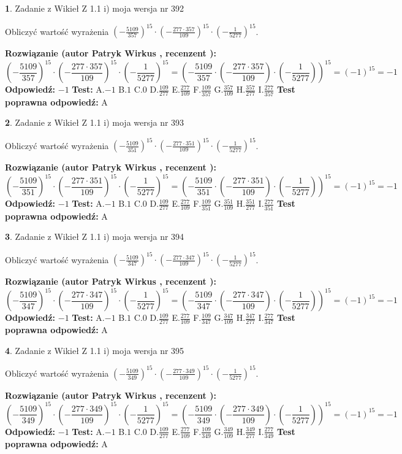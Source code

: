 \documentclass[12pt, a4paper]{article}
\theoremstyle{definition} %
\newtheorem{zad}{}
\newcommand{\zadStart}[1]{\begin{zad}#1\newline}
\newcommand{\zadStop}{\end{zad}}
\newcommand{\rozwStart}[2]{\noindent \textbf{Rozwiązanie (autor #1 , recenzent #2): }\newline}
\newcommand{\rozwStop}{\newline}
\newcommand{\odpStart}{\noindent \textbf{Odpowiedź:}\newline}
\newcommand{\odpStop}{\newline}
\newcommand{\testStart}{\noindent \textbf{Test:}\newline}
\newcommand{\testStop}{\newline}
\newcommand{\kluczStart}{\noindent \textbf{Test poprawna odpowiedź:}\newline}
\newcommand{\kluczStop}{\newline}
\begin{document}
\zadStart{Zadanie z Wikieł Z 1.1 i) moja wersja nr 392}

Obliczyć wartość wyrażenia $(-\frac{5109}{357})^{15} \cdot (-\frac{277 \cdot 357}{109})^{15} \cdot (-\frac{1}{5277})^{15}$.
\zadStop
\rozwStart{Patryk Wirkus}{}
$$(-\frac{5109}{357})^{15} \cdot (-\frac{277 \cdot 357}{109})^{15} \cdot (-\frac{1}{5277})^{15} = (-\frac{5109}{357} \cdot (-\frac{277 \cdot 357}{109}) \cdot (-\frac{1}{5277}))^{15} = (-1)^{15} = -1$$
\rozwStop
\odpStart
$-1$
\odpStop
\testStart
A.$-1$ B.$1$ C.$0$ D.$\frac{109}{277}$ E.$\frac{277}{109}$
F.$\frac{109}{357}$ G.$\frac{357}{109}$
H.$\frac{357}{277}$
I.$\frac{277}{357}$
\testStop
\kluczStart
A
\kluczStop



\zadStart{Zadanie z Wikieł Z 1.1 i) moja wersja nr 393}

Obliczyć wartość wyrażenia $(-\frac{5109}{351})^{15} \cdot (-\frac{277 \cdot 351}{109})^{15} \cdot (-\frac{1}{5277})^{15}$.
\zadStop
\rozwStart{Patryk Wirkus}{}
$$(-\frac{5109}{351})^{15} \cdot (-\frac{277 \cdot 351}{109})^{15} \cdot (-\frac{1}{5277})^{15} = (-\frac{5109}{351} \cdot (-\frac{277 \cdot 351}{109}) \cdot (-\frac{1}{5277}))^{15} = (-1)^{15} = -1$$
\rozwStop
\odpStart
$-1$
\odpStop
\testStart
A.$-1$ B.$1$ C.$0$ D.$\frac{109}{277}$ E.$\frac{277}{109}$
F.$\frac{109}{351}$ G.$\frac{351}{109}$
H.$\frac{351}{277}$
I.$\frac{277}{351}$
\testStop
\kluczStart
A
\kluczStop



\zadStart{Zadanie z Wikieł Z 1.1 i) moja wersja nr 394}

Obliczyć wartość wyrażenia $(-\frac{5109}{347})^{15} \cdot (-\frac{277 \cdot 347}{109})^{15} \cdot (-\frac{1}{5277})^{15}$.
\zadStop
\rozwStart{Patryk Wirkus}{}
$$(-\frac{5109}{347})^{15} \cdot (-\frac{277 \cdot 347}{109})^{15} \cdot (-\frac{1}{5277})^{15} = (-\frac{5109}{347} \cdot (-\frac{277 \cdot 347}{109}) \cdot (-\frac{1}{5277}))^{15} = (-1)^{15} = -1$$
\rozwStop
\odpStart
$-1$
\odpStop
\testStart
A.$-1$ B.$1$ C.$0$ D.$\frac{109}{277}$ E.$\frac{277}{109}$
F.$\frac{109}{347}$ G.$\frac{347}{109}$
H.$\frac{347}{277}$
I.$\frac{277}{347}$
\testStop
\kluczStart
A
\kluczStop



\zadStart{Zadanie z Wikieł Z 1.1 i) moja wersja nr 395}

Obliczyć wartość wyrażenia $(-\frac{5109}{349})^{15} \cdot (-\frac{277 \cdot 349}{109})^{15} \cdot (-\frac{1}{5277})^{15}$.
\zadStop
\rozwStart{Patryk Wirkus}{}
$$(-\frac{5109}{349})^{15} \cdot (-\frac{277 \cdot 349}{109})^{15} \cdot (-\frac{1}{5277})^{15} = (-\frac{5109}{349} \cdot (-\frac{277 \cdot 349}{109}) \cdot (-\frac{1}{5277}))^{15} = (-1)^{15} = -1$$
\rozwStop
\odpStart
$-1$
\odpStop
\testStart
A.$-1$ B.$1$ C.$0$ D.$\frac{109}{277}$ E.$\frac{277}{109}$
F.$\frac{109}{349}$ G.$\frac{349}{109}$
H.$\frac{349}{277}$
I.$\frac{277}{349}$
\testStop
\kluczStart
A
\kluczStop
\end{document}
